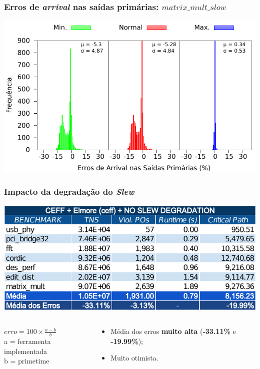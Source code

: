 \documentclass[10pt,a4paper]{beamer}
\begin{document}
		\begin{frame}[t]
			\frametitle{Erros de \textit{arrival} nas saídas primárias: $matrix\_mult\_slow$}
			\begin{center}
				\includegraphics[width=0.9\linewidth]{img/arrival_error/matrix_mult_puri.pdf}\\
			\end{center}
		\end{frame}
		
		\begin{frame}[t]
			\frametitle{Impacto da degradação do \textit{Slew}}
			\begin{center}
				\includegraphics[width=\linewidth]{img/ceff_elmore_no_slew.pdf}
			\end{center}
			\begin{columns}
				\begin{column}{0.4\textwidth}
					\begin{shaded}
						$erro = 100 \times \frac{a - b}{ b } $ \\
						\small{a = ferramenta implementada} \\
						\small{b = primetime}
					\end{shaded}
				\end{column}
				\begin{column}{0.6\textwidth}
					\begin{itemize}
						\item Média dos erros \textbf{muito alta} (\textbf{-33.11\%} e \textbf{-19.99\%});
						\item Muito otimista.
					\end{itemize}
				\end{column}
			\end{columns}	
			
		\end{frame}
		
\end{document}
